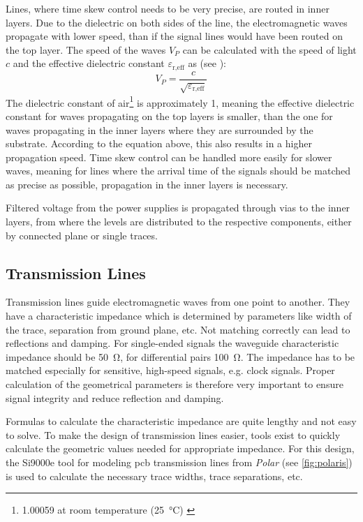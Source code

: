 Lines, where time skew control needs to be very precise, are routed in inner layers. 
Due to the dielectric on both sides of the line, the electromagnetic waves propagate with lower speed, than if the signal lines would have been routed on the top layer.
The speed of the waves $V_P$ can be calculated with the speed of light $c$ and the effective dielectric constant $\varepsilon_\text{r,eff}$ as (see \cite{thierauf}):
\begin{equation}
	V_P = \frac{c}{\sqrt{\varepsilon_\text{r,eff}}}
\end{equation}
The dielectric constant of air\footnote{1.00059 at room temperature (\SI{25}{\degreeCelsius}) \cite{dielectric}} is approximately 1, meaning the effective dielectric constant for waves propagating on the top layers is smaller, than the one for waves propagating in the inner layers where they are surrounded by the substrate.
According to the equation above, this also results in a higher propagation speed. 
Time skew control can be handled more easily for slower waves, meaning for lines where the arrival time of the signals should be matched as precise as possible, propagation in the inner layers is necessary.

Filtered voltage from the power supplies is propagated through vias to the inner layers, from where the levels are distributed to the respective components, either by connected plane or single traces.

\subsection{Transmission Lines}
Transmission lines guide electromagnetic waves from one point to another. 
They have a characteristic impedance which is determined by parameters like width of the trace, separation from ground plane, etc.  
Not matching correctly can lead to reflections and damping.
For single-ended signals the waveguide characteristic impedance should be \SI{50}{\ohm}, for differential pairs \SI{100}{\ohm}.
The impedance has to be matched especially for sensitive, high-speed signals, e.g. clock signals. 
Proper calculation of the geometrical parameters is therefore very important to ensure signal integrity and reduce reflection and damping. 

Formulas to calculate the characteristic impedance are quite lengthy and not easy to solve.
To make the design of transmission lines easier, tools exist to quickly calculate the geometric values needed for appropriate impedance.
For this design, the Si9000e tool for modeling \gls{pcb} transmission lines from \textit{Polar} (see \autoref{fig:polaris}) is used to calculate the necessary trace widths, trace separations, etc.

